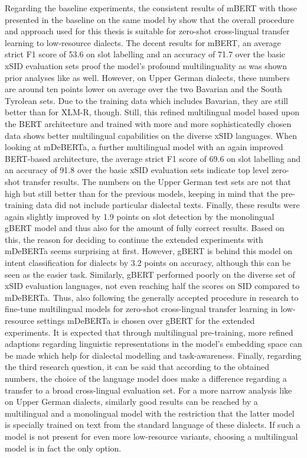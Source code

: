 \documentclass[11pt,a4paper,twoside,openright]{scrbook}
\begin{document}
Regarding the baseline experiments, the consistent results of mBERT with those presented in the baseline on the same model by \citet{van-der-goot-etal-2021-masked} show that the overall procedure and approach used for this thesis is suitable for zero-shot cross-lingual transfer learning to low-resource dialects. The decent results for mBERT, an average strict F1 score of 53.6 on slot labelling and an accuracy of 71.7 over the basic xSID evaluation sets proof the model's profound multilinguality as was shown prior analyses like \citet{pires-etal-2019-multilingual} as well. However, on Upper German dialects, these numbers are around ten points lower on average over the two Bavarian and the South Tyrolean sets. Due to the training data which includes Bavarian, they are still better than for XLM-R, though. Still, this refined multilingual model based upon the BERT architecture and trained with more and more sophisticatedly chosen data shows better multilingual capabilities on the diverse xSID languages. When looking at mDeBERTa, a further multilingual model with an again improved BERT-based architecture, the average strict F1 score of 69.6 on slot labelling and an accuracy of 91.8 over the basic xSID evaluation sets indicate top level zero-shot transfer results. The numbers on the Upper German test sets are not that high but still better than for the previous models, keeping in mind that the pre-training data did not include particular dialectal texts. Finally, these results were again slightly improved by 1.9 points on slot detection by the monolingual gBERT model and thus also for the amount of fully correct results. Based on this, the reason for deciding to continue the extended experiments with mDeBERTa seems surprising at first. However, gBERT is behind this model on intent classification for dialects by 3.2 points on accuracy, although this can be seen as the easier task. Similarly, gBERT performed poorly on the diverse set of xSID evaluation languages, not even reaching half the scores on SID compared to mDeBERTa. Thus, also following the generally accepted procedure in research to fine-tune multilingual models for zero-shot cross-lingual transfer learning in low-resource settings mDeBERTa is chosen over gBERT for the extended experiments. It is expected that through multilingual pre-training, more refined adaptions regarding linguistic representations in the model's embedding space can be made which help for dialectal modelling and task-awareness. Finally, regarding the third research question, it can be said that according to the obtained numbers, the choice of the language model does make a difference regarding a transfer to a broad cross-lingual evaluation set. For a more narrow analysis like on Upper German dialects, similarly good results can be reached by a multilingual and a monolingual model with the restriction that the latter model is specially trained on text from the standard language of these dialects. If such a model is not present for even more low-resource variants, choosing a multilingual model is in fact the only option. 
\end{document}
